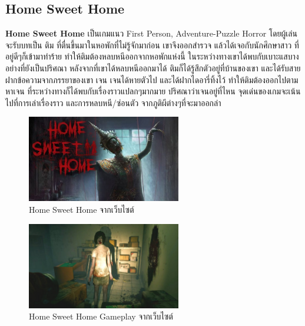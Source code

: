   


\subsection{Home Sweet Home}
\subsubitem \textbf{Home Sweet Home} \cite{home-sweet-home:theory} เป็นเกมแนว First Person, Adventure-Puzzle Horror โดยผู้เล่นจะรับบทเป็น ติม ที่ตื่นขึ้นมาในหอพักที่ไม่รู้จักมาก่อน เขาจึงออกสำรวจ แล้วได้เจอกับนักศึกษาสาว ที่อยู่ดีๆก็เข้ามาทำร้าย ทำให้ติมต้องหลบหนีออกจากหอพักแห่งนี้ ในระหว่างทางเขาได้พบกับเบาะแสบางอย่างที่ยังเป็นปริศณา หลังจากที่เขาได้หลบหนีออกมาได้ ติมก็ได้รู้สึกตัวอยู่ที่บ้านของเขา และได้รับสายฝากข้อความจากภรรยาของเขา เจน เจนได้หายตัวไป และได้ฝากไดอารี่ทิ้งไว้ ทำให้ติมต้องออกไปตามหาเจน ที่ระหว่างทางก็ได้พบกับเรื่องราวแปลกๆมากมาย ปริศณาว่าเจนอยู่ที่ไหน จุดเด่นของเกมจะเน้นไปที่การเล่าเรื่องราว และการหลบหนี/ซ่อนตัว จากภูติผีต่างๆที่จะมาออกล่า
\begin{figure}[h]
  \centering
  \includegraphics[width=0.6\textwidth, height=0.2\textheight]{Images/800px-HomeSweetHomePoster1.jpg}
  \caption{Home Sweet Home จากเว็บไซต์}\label{HomeSweetHomePoster1}
\end{figure}

\begin{figure}[h]
  \centering
  \includegraphics[width=0.6\textwidth, height=0.2\textheight]{Images/maxresdefault.jpg}
  \caption{Home Sweet Home Gameplay จากเว็บไซต์}\label{HomeSweetHomeWalkthrough}
\end{figure}

